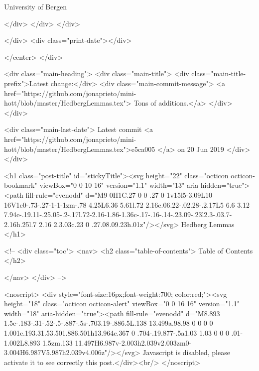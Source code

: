                   University of Bergen
                
                </div>
            </div>
          </div>
          
          
        </div>
        <div class="print-date"></div>
        
        
    </center>
  </div>

  
  <div class="main-heading">
    <div class="main-title">
      <div class="main-title-prefix">Latest change:</div>
      <div class="main-commit-message">
            <a href="https://github.com/jonaprieto/mini-hott/blob/master/HedbergLemmas.tex">
              Tons of additions.</a>
      </div>
    </div>

    <div class="main-last-date">
      Latest commit <a href="https://github.com/jonaprieto/mini-hott/blob/master/HedbergLemmas.tex">e5ca005 </a> on  20 Jun 2019
    </div>
  </div>
  
  <h1 class="post-title" id="stickyTitle"><svg height="22" class="octicon octicon-bookmark" viewBox="0 0 10 16" version="1.1" width="13" aria-hidden="true"><path fill-rule="evenodd" d="M9 0H1C.27 0 0 .27 0 1v15l5-3.09L10 16V1c0-.73-.27-1-1-1zm-.78 4.25L6.36 5.61l.72 2.16c.06.22-.02.28-.2.17L5 6.6 3.12 7.94c-.19.11-.25.05-.2-.17l.72-2.16-1.86-1.36c-.17-.16-.14-.23.09-.23l2.3-.03.7-2.16h.25l.7 2.16 2.3.03c.23 0 .27.08.09.23h.01z"/></svg> Hedberg Lemmas
  </h1>

  <!-- 
  <div class="toc">
    <nav>
    <h2 class="table-of-contents"> Table of Contents </h2>
      

    </nav>
  </div>
   -->

  <noscript>
  <div style="font-size:16px;font-weight:700; color:red;"><svg height="18" class="octicon octicon-alert" viewBox="0 0 16 16" version="1.1" width="18" aria-hidden="true"><path fill-rule="evenodd" d="M8.893 1.5c-.183-.31-.52-.5-.887-.5s-.703.19-.886.5L.138 13.499a.98.98 0 0 0 0 1.001c.193.31.53.501.886.501h13.964c.367 0 .704-.19.877-.5a1.03 1.03 0 0 0 .01-1.002L8.893 1.5zm.133 11.497H6.987v-2.003h2.039v2.003zm0-3.004H6.987V5.987h2.039v4.006z"/></svg> Javascript is disabled, please activate it to see correctly this post.</div><br/>
  </noscript>

